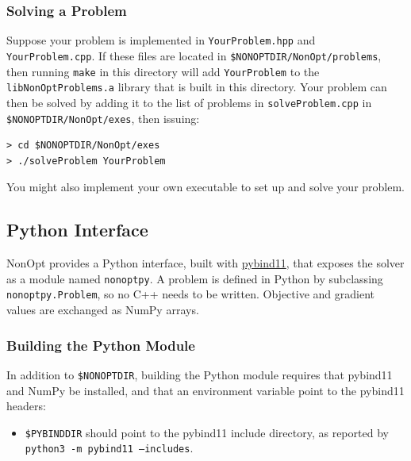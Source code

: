 \documentclass{article}
\begin{document}
\subsubsection{Solving a Problem}

Suppose your problem is implemented in \texttt{YourProblem.hpp} and \texttt{YourProblem.cpp}.  If these files are located in \texttt{\$NONOPTDIR/NonOpt/problems}, then running \texttt{make} in this directory will add \texttt{YourProblem} to the \texttt{libNonOptProblems.a} library that is built in this directory.  Your problem can then be solved by adding it to the list of problems in \texttt{solveProblem.cpp} in \texttt{\$NONOPTDIR/NonOpt/exes}, then issuing:

\begin{verbatim}
> cd $NONOPTDIR/NonOpt/exes
> ./solveProblem YourProblem
\end{verbatim}

You might also implement your own executable to set up and solve your problem.

\subsection{Python Interface}\label{sec.python}

NonOpt provides a Python interface, built with \href{https://github.com/pybind/pybind11}{pybind11}, that exposes the solver as a module named \texttt{nonoptpy}.  A problem is defined in Python by subclassing \texttt{nonoptpy.Problem}, so no C++ needs to be written.  Objective and gradient values are exchanged as NumPy arrays.

\subsubsection{Building the Python Module}

In addition to \texttt{\$NONOPTDIR}, building the Python module requires that pybind11 and NumPy be installed, and that an environment variable point to the pybind11 headers:

\begin{itemize}
  \item \texttt{\$PYBINDDIR} should point to the pybind11 include directory, as reported by
        \texttt{python3 -m pybind11 --includes}.
\end{itemize}
\end{document}
